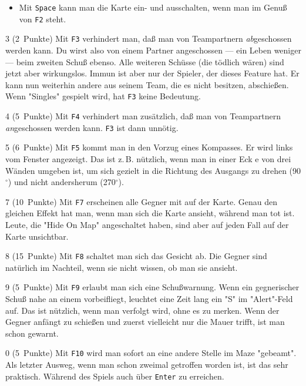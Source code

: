 \documentclass[12pt,twoside]{article}
\newcommand{\grad}{$^\circ$}
\newcommand{\deflabel}[1]{\bf #1\hfill}%
\newenvironment{deflist}[1]%
{\begin{list}{}%
{\settowidth{\labelwidth}{\bf #1}%
\setlength{\leftmargin}{\labelwidth}%
\addtolength{\leftmargin}{\labelsep}%
\renewcommand{\makelabel}{\deflabel}}}%
{\end{list}}%
\begin{document}
\begin{deflist}{Win}
\begin{itemize}
\item Mit \verb|Space| kann man die Karte ein- und ausschalten, wenn man im 
Genu\ss{} von \verb|F2| steht.

\end{itemize}


\item[3] (2~Punkte) Mit \verb|F3| verhindert man, da\ss{} man von Teampartnern 
{\em ab\/}ge\-schos\-sen werden kann. Du wirst also von einem Partner 
angeschossen --- ein Leben weniger --- beim zweiten Schu\ss{} ebenso. Alle 
weiteren Sch\"usse (die t\"odlich w\"aren) sind jetzt aber wirkungslos. Immun ist 
aber nur der Spieler, der dieses Feature hat. Er kann nun weiterhin andere 
aus seinem Team, die es nicht besitzen, abschie\ss{}en. Wenn "Singles" 
gespielt wird, hat \verb|F3| keine Bedeutung.


\item[4] (5~Punkte) Mit \verb|F4| verhindert man zus\"atzlich, da\ss{} man von 
Teampartnern {\em an\/}ge\-schos\-sen werden kann. \verb|F3| ist dann 
unn\"otig.


\item[5] (6~Punkte) Mit \verb|F5| kommt man in den Vorzug eines Kompasses. 
Er wird links vom Fenster angezeigt. Das ist z.\,B. n\"utzlich, wenn man in 
einer Eck e von drei W\"anden umgeben ist, um sich gezielt in die Richtung 
des Ausgangs zu drehen (90\grad) und nicht andersherum (270\grad).


\item[7] (10~Punkte) Mit \verb|F7| erscheinen alle Gegner mit auf der Karte. 
Genau den gleichen Effekt hat man, wenn man sich die Karte ansieht, w\"ahrend 
man tot ist. Leute, die "Hide On Map" angeschaltet haben, sind aber auf 
jeden Fall auf der Karte unsichtbar.


\item[8] (15~Punkte) Mit \verb|F8| schaltet man sich das Gesicht ab. Die 
Gegner sind nat\"urlich im Nachteil, wenn sie nicht wissen, ob man sie 
ansieht.


\item[9] (5~Punkte) Mit \verb|F9| erlaubt man sich eine Schu\ss{}warnung. Wenn 
ein gegnerischer Schu\ss{} nahe an einem vorbeifliegt, leuchtet eine Zeit lang 
ein "S" im "Alert"-Feld auf. Das ist n\"utzlich, wenn man verfolgt wird, 
ohne es zu merken. Wenn der Gegner anf\"angt zu schie\ss{}en und zuerst vielleicht 
nur die Mauer trifft, ist man schon gewarnt.


\item[0] (5~Punkte) Mit \verb|F10| wird man sofort an eine andere Stelle im 
Maze "gebeamt". Als letzter Ausweg, wenn man schon zweimal getroffen 
worden ist, ist das sehr praktisch. W\"ahrend des Spiels auch \"uber 
\verb|Enter| zu erreichen.

\end{deflist}
\end{document}
